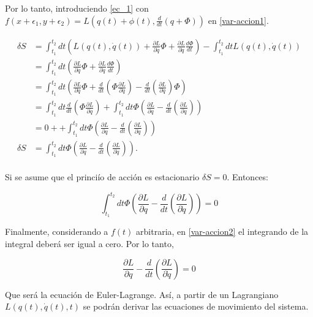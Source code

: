 \documentclass[../main.tex]{subfiles}
\begin{document}
Por lo tanto, introduciendo \eqref{ec_1} con $f(x +\epsilon_1, y + \epsilon_2) = L(q(t) + \phi(t), \frac{d}{dt}\left(q + \Phi \right))$ en \eqref{var-accion1}.

\begin{align*}
    \delta S &=  \int_{t_1}^{t_2}dt \left( L(q(t),\dot{q}(t)) + \frac{\partial L}{\partial q}\Phi + \frac{\partial L}{\partial \dot{q}} \frac{d\Phi}{dt} \right) -  \int_{t_1}^{t_2}dt L(q(t), \dot{q}(t))\\ 
    &=  \int_{t_1}^{t_2}dt  \left(\frac{\partial L}{\partial q}\Phi + \frac{\partial L}{\partial \dot{q}} \frac{d\Phi}{dt} \right) \\
    &=  \int_{t_1}^{t_2}dt  \left(\frac{\partial L}{\partial q}\Phi + \frac{d}{dt}\left( \Phi \frac{\partial L}{\partial \dot{q}} \right) - \frac{d}{dt}\left( \frac{\partial L}{\partial \dot{q}} \right)\Phi \right) \\
    &=  \int_{t_1}^{t_2}dt \frac{d}{dt}\left( \Phi \frac{\partial L}{\partial \dot{q}} \right) + \int_{t_1}^{t_2}dt \Phi \left(\frac{\partial L}{\partial q}- \frac{d}{dt}\left( \frac{\partial L}{\partial \dot{q}} \right) \right) \\
    &= 0 + + \int_{t_1}^{t_2}dt \Phi \left(\frac{\partial L}{\partial q}- \frac{d}{dt}\left( \frac{\partial L}{\partial \dot{q}} \right) \right) \\
    \delta S &=\int_{t_1}^{t_2}dt \Phi \left(\frac{\partial L}{\partial q}- \frac{d}{dt}\left( \frac{\partial L}{\partial \dot{q}} \right) \right).\\
\end{align*}

Si se asume que el princiío de acción es estacionario $\delta S = 0$. Entonces: 

\begin{equation}
    \int_{t_1}^{t_2}dt \Phi \left(\frac{\partial L}{\partial q}- \frac{d}{dt}\left( \frac{\partial L}{\partial \dot{q}} \right) \right) = 0 \label{var-accion2}
\end{equation}

Finalmente, considerando a $f(t)$ arbitraria, en \eqref{var-accion2} el integrando de la integral deberá ser igual a cero. Por lo tanto, 

\begin{equation}
    \frac{\partial L}{\partial q} - \frac{d}{dt} \left( \frac{\partial L}{\partial \dot{q}} \right) = 0
\end{equation}

Que será la ecuación de Euler-Lagrange. Así, a partir de un Lagrangiano $L(q(t), \dot{q}(t),t)$ se podrán derivar las ecuaciones de movimiento del sistema. \\
\end{document}
